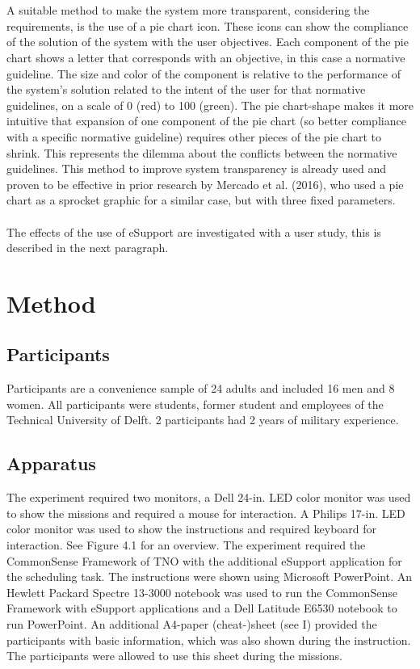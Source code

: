 \documentclass[twoside,twocolumn]{article}
\begin{document}
\\\\
A suitable method to make the system more transparent, considering the requirements, is the use of a pie chart icon. These icons can show the compliance of the solution of the system with the user objectives. Each component of the pie chart shows a letter that corresponds with an objective, in this case a normative guideline. The size and color of the component is relative to the performance of the system's solution related to the intent of the user for that normative guidelines, on a scale of 0 (red) to 100 (green). The pie chart-shape makes it more intuitive that expansion of one component of the pie chart (so better compliance with a specific normative guideline) requires other pieces of the pie chart to shrink. This represents the dilemma about the conflicts between the normative guidelines. This method to improve system transparency is already used and proven to be effective in prior research by Mercado et al. (2016), who used a pie chart as a sprocket graphic for a similar case, but with three fixed parameters.  
\\\\
The effects of the use of eSupport are investigated with a user study, this is described in the next paragraph.

\section{Method}

\subsection{Participants}
Participants are a convenience sample of 24 adults and included 16 men and 8 women. All participants were students, former student and employees of the Technical University of Delft. 2 participants had 2 years of military experience. 

\subsection{Apparatus}
The experiment required two monitors, a Dell 24-in. LED color monitor was used to show the missions and required a mouse for interaction. A Philips 17-in. LED color monitor was used to show the instructions and required keyboard for interaction. See Figure 4.1 for an overview. The experiment required the CommonSense Framework of TNO with the additional eSupport application for the scheduling task. The instructions were shown using Microsoft PowerPoint. An Hewlett Packard Spectre 13-3000 notebook was used to run the CommonSense Framework with eSupport applications and a Dell Latitude E6530 notebook to run PowerPoint. An additional A4-paper (cheat-)sheet (see I) provided the participants with basic information, which was also shown during the instruction. The participants were allowed to use this sheet during the missions.
\end{document}
